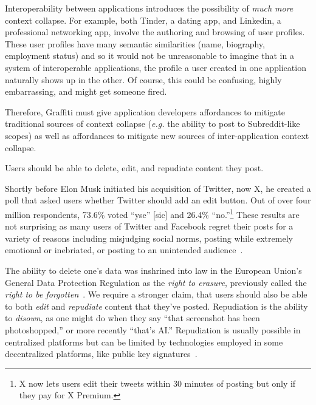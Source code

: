 Interoperability between applications introduces the possibility
of \emph{much more} context collapse.
For example, both Tinder, a dating app, and Linkedin, a professional networking app, involve the authoring
and browsing of user profiles.
These user profiles have many semantic similarities (name, biography, employment status) and so
it would not be unreasonable to imagine that in a system of interoperable applications,
the profile a user created in one application
naturally shows up in the other.
Of course, this could be confusing, highly embarrassing, and might get someone fired.

Therefore, Graffiti must give application developers affordances to mitigate traditional sources
of context collapse (\emph{e.g.} the ability to post to Subreddit-like scopes)
as well as affordances to mitigate new sources of inter-application context collapse.


\begin{requirement}[Forgiving]
\label{requirements:forgiving}
    Users should be able to delete, edit, and repudiate content they post.
\end{requirement}

Shortly before Elon Musk initiated his acquisition of Twitter, now X,
he created a poll that asked users whether Twitter should add an edit button.
Out of over four million respondents, 73.6\% voted ``yse'' [sic] and 26.4\% ``no.''\footnote{
  X now lets users edit their tweets within 30 minutes of posting but only
  if they pay for X Premium.
} These results are not surprising as many users of Twitter and Facebook regret
their posts for a variety of reasons
including misjudging social norms, posting while extremely emotional or inebriated,
or posting to an unintended audience~\cite{regret, regrettwitter}.

The ability to delete one's data was inshrined into law in the European Union's
General Data Protection Regulation as
the \emph{right to erasure}, previously called the \emph{right to be forgotten}~\cite{gdpr}.
We require a stronger claim, that users should also be able to both \emph{edit}
and \emph{repudiate} content that they've posted. Repudiation is the ability to \emph{disown},
as one might do when they say ``that screenshot has been photoshopped,''
or more recently ``that's AI.'' Repudiation is usually possible in centralized platforms
but can be limited by technologies employed in some decentralized platforms,
like public key signatures~\cite{offtherecord}.

